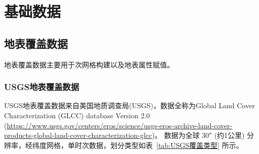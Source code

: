 \chapter{基础数据}\label{基础数据}




\section{地表覆盖数据}\label{地表覆盖数据}
地表覆盖数据主要用于次网格构建以及地表属性赋值。
\subsection{USGS地表覆盖数据}\label{USGS地表覆盖数据}
USGS地表覆盖数据来自美国地质调查局(USGS)，数据全称为Global Land Cover Characterization (GLCC) database Version 2.0 
(\url{https://www.usgs.gov/centers/eros/science/usgs-eros-archive-land-cover-products-global-land-cover-characterization-glcc})。
数据为全球 \ang{;;30} (约1公里) 分辨率，经纬度网格，单时次数据，划分类型如表~\ref{tab:USGS覆盖类型} 所示。
